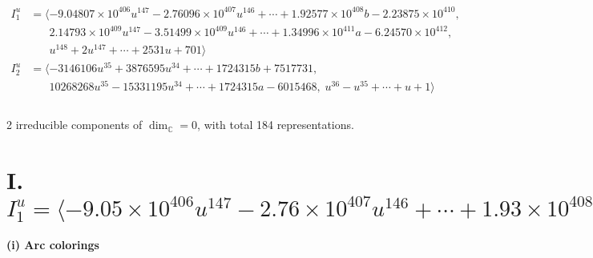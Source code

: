 \documentclass[1p]{elsarticle_modified}
\theoremstyle{definition}
\begin{document}
\begin{align*}
I^u_{1}&=\langle 
-9.04807\times10^{406} u^{147}-2.76096\times10^{407} u^{146}+\cdots+1.92577\times10^{408} b-2.23875\times10^{410},\\
\phantom{I^u_{1}}&\phantom{= \langle  }2.14793\times10^{409} u^{147}-3.51499\times10^{409} u^{146}+\cdots+1.34996\times10^{411} a-6.24570\times10^{412},\\
\phantom{I^u_{1}}&\phantom{= \langle  }u^{148}+2 u^{147}+\cdots+2531 u+701\rangle \\
I^u_{2}&=\langle 
-3146106 u^{35}+3876595 u^{34}+\cdots+1724315 b+7517731,\\
\phantom{I^u_{2}}&\phantom{= \langle  }10268268 u^{35}-15331195 u^{34}+\cdots+1724315 a-6015468,\;u^{36}- u^{35}+\cdots+u+1\rangle \\
\\
\end{align*}
\raggedright * 2 irreducible components of $\dim_{\mathbb{C}}=0$, with total 184 representations.\\
\newpage
\renewcommand{\arraystretch}{1}
\centering \section*{I. $I^u_{1}= \langle -9.05\times10^{406} u^{147}-2.76\times10^{407} u^{146}+\cdots+1.93\times10^{408} b-2.24\times10^{410},\;2.15\times10^{409} u^{147}-3.51\times10^{409} u^{146}+\cdots+1.35\times10^{411} a-6.25\times10^{412},\;u^{148}+2 u^{147}+\cdots+2531 u+701 \rangle$}
\flushleft \textbf{(i) Arc colorings}\\
\end{document}
